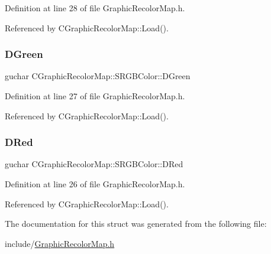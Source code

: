 Definition at line 28 of file Graphic\+Recolor\+Map.\+h.



Referenced by C\+Graphic\+Recolor\+Map\+::\+Load().

\hypertarget{structCGraphicRecolorMap_1_1SRGBColor_aff20fa0c0e6037339a1232cb2b899774}{}\label{structCGraphicRecolorMap_1_1SRGBColor_aff20fa0c0e6037339a1232cb2b899774} 
\subsubsection{\texorpdfstring{D\+Green}{DGreen}}
{\footnotesize\ttfamily guchar C\+Graphic\+Recolor\+Map\+::\+S\+R\+G\+B\+Color\+::\+D\+Green}



Definition at line 27 of file Graphic\+Recolor\+Map.\+h.



Referenced by C\+Graphic\+Recolor\+Map\+::\+Load().

\hypertarget{structCGraphicRecolorMap_1_1SRGBColor_a8562e30b0e4489fdde36eddd19c7de40}{}\label{structCGraphicRecolorMap_1_1SRGBColor_a8562e30b0e4489fdde36eddd19c7de40} 
\subsubsection{\texorpdfstring{D\+Red}{DRed}}
{\footnotesize\ttfamily guchar C\+Graphic\+Recolor\+Map\+::\+S\+R\+G\+B\+Color\+::\+D\+Red}



Definition at line 26 of file Graphic\+Recolor\+Map.\+h.



Referenced by C\+Graphic\+Recolor\+Map\+::\+Load().



The documentation for this struct was generated from the following file\+:\begin{DoxyCompactItemize}
\item 
include/\hyperlink{GraphicRecolorMap_8h}{Graphic\+Recolor\+Map.\+h}\end{DoxyCompactItemize}
